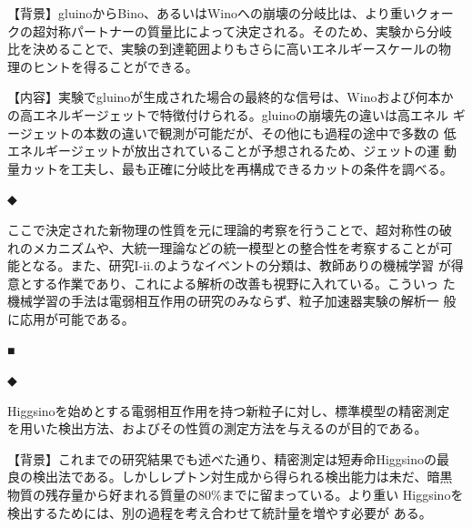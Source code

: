 \documentclass[11pt,a4paper,twoside,dvipdfmx]{jarticle}		%
\newcommand{\研究課題名}{粒子加速器を用いた電弱相互作用を持つ新物理の探索}
\newcommand{\研究機関名}{東京大学}
\newcommand{\申請者氏名}{千草颯}
\newcommand{\研究代表者氏名}{\申請者氏名}
\newcommand{\研究期間の最終元号年度}{34}	%
\begin{document}
{\vspace*{1mm}


\vspace*{1mm}

【背景】gluinoからBino、あるいはWinoへの崩壊の分岐比は、より重いクォー
クの超対称パートナーの質量比によって決定される。そのため、実験から分岐
比を決めることで、実験の到達範囲よりもさらに高いエネルギースケールの物
理のヒントを得ることができる。


【内容】実験でgluinoが生成された場合の最終的な信号は、Winoおよび何本か
の高エネルギージェットで特徴付けられる。gluinoの崩壊先の違いは高エネル
ギージェットの本数の違いで観測が可能だが、その他にも過程の途中で多数の
低エネルギージェットが放出されていることが予想されるため、ジェットの運
動量カットを工夫し、最も正確に分岐比を再構成できるカットの条件を調べる。

\vspace*{1mm}

◆ 

\vspace*{1mm}

ここで決定された新物理の性質を元に理論的考察を行うことで、超対称性の破
れのメカニズムや、大統一理論などの統一模型との整合性を考察することが可
能となる。また、研究I-ii.のようなイベントの分類は、教師ありの機械学習
が得意とする作業であり、これによる解析の改善も視野に入れている。こういっ
た機械学習の手法は電弱相互作用の研究のみならず、粒子加速器実験の解析一
般に応用が可能である。

\vspace*{1mm}

■ 

\vspace*{1mm}

◆ 

\vspace*{1mm}

Higgsinoを始めとする電弱相互作用を持つ新粒子に対し、標準模型の精密測定
を用いた検出方法、およびその性質の測定方法を与えるのが目的である。

\vspace*{1mm}


\vspace*{1mm}

【背景】これまでの研究結果でも述べた通り、精密測定は短寿命Higgsinoの最
良の検出法である。しかしレプトン対生成から得られる検出能力は未だ、暗黒
物質の残存量から好まれる質量の$80\%$までに留まっている。より重い
Higgsinoを検出するためには、別の過程を考え合わせて統計量を増やす必要が
ある。

}
\end{document}
